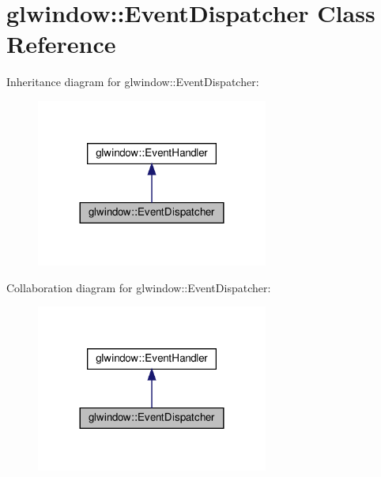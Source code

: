 \hypertarget{classglwindow_1_1_event_dispatcher}{}\section{glwindow\+:\+:Event\+Dispatcher Class Reference}
\label{classglwindow_1_1_event_dispatcher}


Inheritance diagram for glwindow\+:\+:Event\+Dispatcher\+:
\nopagebreak
\begin{figure}[H]
\begin{center}
\leavevmode
\includegraphics[width=216pt]{classglwindow_1_1_event_dispatcher__inherit__graph}
\end{center}
\end{figure}


Collaboration diagram for glwindow\+:\+:Event\+Dispatcher\+:
\nopagebreak
\begin{figure}[H]
\begin{center}
\leavevmode
\includegraphics[width=216pt]{classglwindow_1_1_event_dispatcher__coll__graph}
\end{center}
\end{figure}
